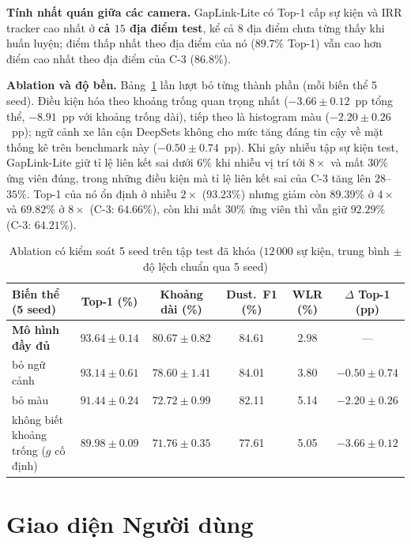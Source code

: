 \textbf{Tính nhất quán giữa các camera.} GapLink-Lite có Top-1 cấp sự kiện và IRR tracker cao nhất ở \textbf{cả $15$ địa điểm test}, kể cả $8$ địa điểm chưa từng thấy khi huấn luyện; điểm thấp nhất theo địa điểm của nó ($89.7\%$ Top-1) vẫn cao hơn điểm cao nhất theo địa điểm của C-3 ($86.8\%$).

\textbf{Ablation và độ bền.} Bảng~\ref{tab:ablation_results} lần lượt bỏ từng thành phần (mỗi biến thể 5 seed). Điều kiện hóa theo khoảng trống quan trọng nhất ($-3.66 \pm 0.12$~pp tổng thể, $-8.91$~pp với khoảng trống dài), tiếp theo là histogram màu ($-2.20 \pm 0.26$~pp); ngữ cảnh xe lân cận DeepSets không cho mức tăng đáng tin cậy về mặt thống kê trên benchmark này ($-0.50 \pm 0.74$~pp). Khi gây nhiễu tập sự kiện test, GapLink-Lite giữ tỉ lệ liên kết sai dưới $6\%$ khi nhiễu vị trí tới $8\times$ và mất $30\%$ ứng viên đúng, trong những điều kiện mà tỉ lệ liên kết sai của C-3 tăng lên $28$--$35\%$. Top-1 của nó ổn định ở nhiễu $2\times$ ($93.23\%$) nhưng giảm còn $89.39\%$ ở $4\times$ và $69.82\%$ ở $8\times$ (C-3: $64.66\%$), còn khi mất $30\%$ ứng viên thì vẫn giữ $92.29\%$ (C-3: $64.21\%$).

\begin{table}[H]
    \centering
    \caption{Ablation có kiểm soát 5 seed trên tập test đã khóa ($12\,000$ sự kiện, trung bình $\pm$ độ lệch chuẩn qua 5 seed)}
    \label{tab:ablation_results}
    \small\setlength{\tabcolsep}{3.0pt}
    \begin{tabularx}{\textwidth}{X c c c c c}
        \toprule
        \textbf{Biến thể (5 seed)} & \textbf{Top-1 (\%)} & \textbf{Khoảng dài (\%)} & \textbf{Dust.\ F1 (\%)} & \textbf{WLR (\%)} & \textbf{$\Delta$ Top-1 (pp)} \\
        \midrule
        \textbf{Mô hình đầy đủ} & $\mathbf{93.64\pm0.14}$ & $\mathbf{80.67\pm0.82}$ & $\mathbf{84.61}$ & $\mathbf{2.98}$ & --- \\
        bỏ ngữ cảnh & $93.14\pm0.61$ & $78.60\pm1.41$ & 84.01 & 3.80 & $-0.50\pm0.74$ \\
        bỏ màu & $91.44\pm0.24$ & $72.72\pm0.99$ & 82.11 & 5.14 & $-2.20\pm0.26$ \\
        không biết khoảng trống ($g$ cố định) & $89.98\pm0.09$ & $71.76\pm0.35$ & 77.61 & 5.05 & $-3.66\pm0.12$ \\
        \bottomrule
    \end{tabularx}
\end{table}

\section{Giao diện Người dùng}
\label{sec:user_interface}

